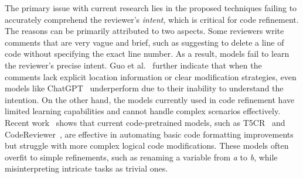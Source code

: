 The primary issue with current research lies in the proposed techniques failing to accurately comprehend the reviewer's \textit{intent}, which is critical for code refinement. The reasons can be primarily attributed to two aspects. Some reviewers write comments that are very vague and brief, such as suggesting to delete a line of code without specifying the exact line number. As a result, models fail to learn the reviewer's precise intent. Guo et al.~\cite{guo2024exploring} further indicate that when the comments lack explicit location information or clear modification strategies, even models like ChatGPT~\cite{ouyang2022training,achiam2023gpt} underperform due to their inability to understand the intention. On the other hand, the models currently used in code refinement have limited learning capabilities and cannot handle complex scenarios effectively. Recent work~\cite{tufano2024code} shows that current code-pretrained models, such as T5CR~\cite{tufano2022using} and CodeReviewer~\cite{li2022automating}, are effective in automating basic code formatting improvements but struggle with more complex logical code modifications. These models often overfit to simple refinements, such as renaming a variable from \textit{a} to \textit{b}, while misinterpreting intricate tasks as trivial ones.






